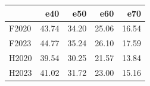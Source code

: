 \begin{tabular}{lrrrr}
\toprule
 & e40 & e50 & e60 & e70 \\
\midrule
F2020 & 43.74 & 34.20 & 25.06 & 16.54 \\
F2023 & 44.77 & 35.24 & 26.10 & 17.59 \\
H2020 & 39.54 & 30.25 & 21.57 & 13.84 \\
H2023 & 41.02 & 31.72 & 23.00 & 15.16 \\
\bottomrule
\end{tabular}
